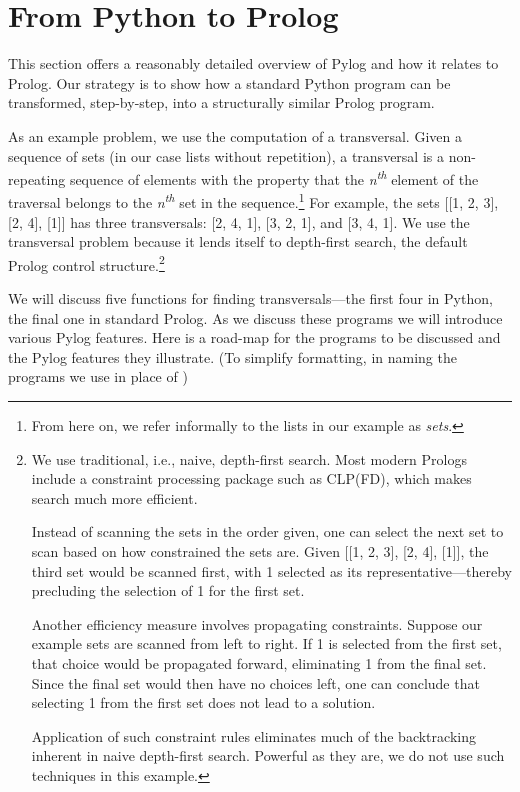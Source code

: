 \section{From Python to Prolog}\label{sec:Pylog}
This section offers a reasonably detailed overview of Pylog and how it relates to Prolog. Our strategy is to show how a standard Python program can be transformed, step-by-step, into a structurally similar Prolog program. 

As an example problem, we use the computation of a transversal. Given a sequence of sets (in our case lists without repetition), a transversal is a non-repeating sequence of elements with the property that the \textit{n\textsuperscript{th}} element of the traversal belongs to the \textit{n\textsuperscript{th}} set in the sequence.\footnote{From here on, we refer informally to the lists in our example as \textit{sets}.}  For example, the sets [[1, 2, 3], [2, 4], [1]] has three transversals: [2, 4, 1], [3, 2, 1], and [3, 4, 1]. We use the transversal problem because it lends itself to depth-first search, the default Prolog control structure.\footnote{We use traditional, i.e., naive, depth-first search. Most modern Prologs include a constraint processing package such as CLP(FD)\cite{Triska2016}, which makes search much more efficient.

Instead of scanning the sets in the order given, one can select the next set to scan based on how constrained the sets are. Given [[1, 2, 3], [2, 4], [1]], the third set would be scanned first, with 1 selected as its representative---thereby precluding the selection of 1 for the first set.

Another efficiency measure involves propagating constraints. Suppose our example sets are scanned from left to right. If 1 is selected from the first set, that choice would be propagated forward, eliminating 1 from the final set. Since the final set would then have no choices left, one can conclude that selecting 1 from the first set does not lead to a solution. 

Application of such constraint rules eliminates much of the backtracking inherent in naive depth-first search. Powerful as they are, we do not use such techniques in this example.}

We will discuss five functions for finding transversals---the first four in Python, the final one in standard Prolog. As we discuss these programs we will introduce various Pylog features. Here is a road-map for the programs to be discussed and the Pylog features they illustrate. (To simplify formatting, in naming the programs we use  in place of )

